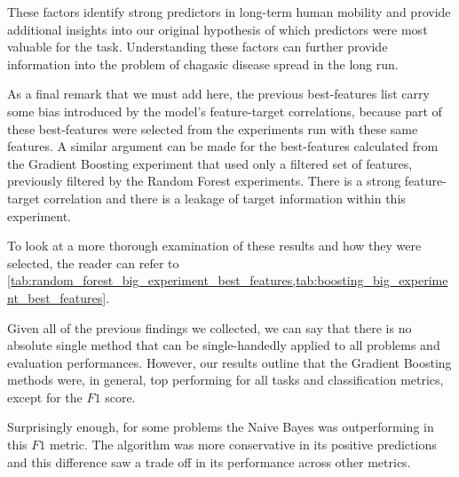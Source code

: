 These factors identify strong predictors in long-term human mobility and provide additional insights into our original hypothesis of which predictors were most valuable for the task.
Understanding these factors can further provide information into the problem of chagasic disease spread in the long run.

As a final remark that we must add here, the previous best-features list carry some bias introduced by the model's feature-target correlations, because part of these best-features were selected from the experiments run with these same features.
A similar argument can be made for the best-features calculated from the Gradient Boosting experiment that used only a filtered set of features, previously filtered by the Random Forest experiments.
There is a strong feature-target correlation and there is a leakage of target information within this experiment.

To look at a more thorough examination of these results and how they were selected, the reader can refer to \cref{tab:random_forest_big_experiment_best_features,tab:boosting_big_experiment_best_features}.





Given all of the previous findings we collected, we can say that there is no absolute single method that can be single-handedly applied to all problems and evaluation performances.
However, our results outline that the Gradient Boosting methods were, in general, top performing for all tasks and classification metrics, except for the $F1$ score.

Surprisingly enough, for some problems the Naive Bayes was outperforming in this $F1$ metric.
The algorithm was more conservative in its positive predictions and this difference saw a trade off in its performance across other metrics.


